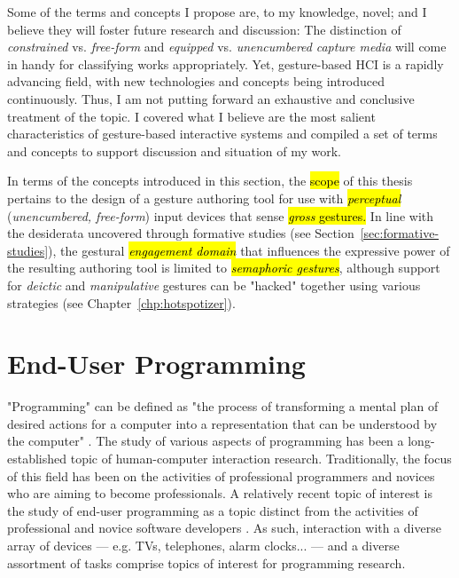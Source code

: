 Some of the terms and concepts I propose are, to my knowledge, novel; and I believe they will foster future research and discussion: The distinction of \emph{constrained} vs. \emph{free-form} and \emph{equipped} vs. \emph{unencumbered} \emph{capture media} will come in handy for classifying works appropriately. Yet, gesture-based HCI is a rapidly advancing field, with new technologies and concepts being introduced continuously. Thus, I am not putting forward an exhaustive and conclusive treatment of the topic. I covered what I believe are the most salient characteristics of gesture-based interactive systems and compiled a set of terms and concepts to support discussion and situation of my work.

In terms of the concepts introduced in this section, the \hl{scope} of this thesis pertains to the design of a gesture authoring tool for use with \hl{\emph{perceptual}} (\emph{unencumbered, free-form}) input devices that sense \hl{\emph{gross} gestures.} In line with the desiderata uncovered through formative studies (see Section~\ref{sec:formative-studies}), the gestural \hl{\emph{engagement domain}} that influences the expressive power of the resulting authoring tool is limited to \hl{\emph{semaphoric gestures}}, although support for \emph{deictic} and \emph{manipulative} gestures can be "hacked" together using various strategies (see Chapter~\ref{chp:hotspotizer}).

\section{End-User Programming}
\label{sec:end-user-programming}

"Programming" can be defined as "the process of transforming a mental plan of desired actions for a computer into a representation that can be understood by the computer" \parencite{Myers:2006}. The study of various aspects of programming has been a long-established topic of human-computer interaction research. Traditionally, the focus of this field has been on the activities of professional programmers and novices who are aiming to become professionals. A relatively recent topic of interest is the study of end-user programming as a topic distinct from the activities of professional and novice software developers \parencite{Myers:2006}. As such, interaction with a diverse array of devices --- e.g. TVs, telephones, alarm clocks... --- and a diverse assortment of tasks comprise topics of interest for programming research.

